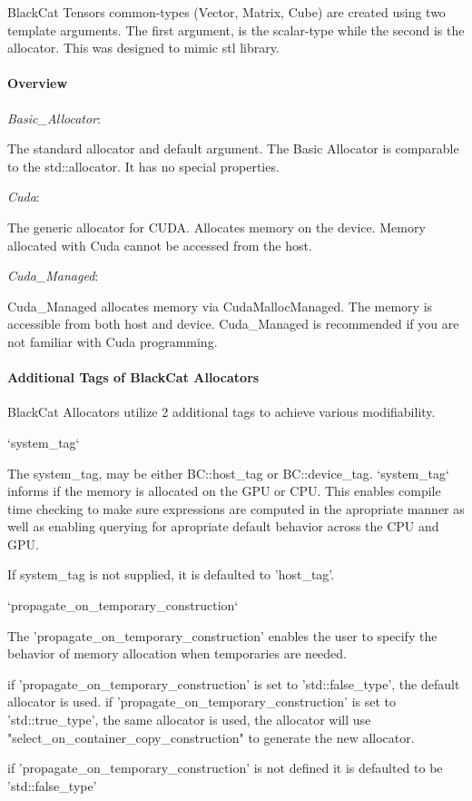 Black\+Cat Tensor\textquotesingle{}s common-\/types (Vector, Matrix, Cube) are created using two template arguments. The first argument, is the scalar-\/type while the second is the allocator. This was designed to mimic {\ttfamily stl} library.

\paragraph*{Overview}

{\itshape Basic\+\_\+\+Allocator}\+: \begin{DoxyVerb}The standard allocator and default argument.
The Basic Allocator is comparable to the std::allocator.
It has no special properties.
\end{DoxyVerb}


{\itshape Cuda}\+: \begin{DoxyVerb}The generic allocator for CUDA. 
Allocates memory on the device. 
Memory allocated with Cuda cannot be accessed from the host.
\end{DoxyVerb}


{\itshape Cuda\+\_\+\+Managed}\+: \begin{DoxyVerb}Cuda_Managed allocates memory via CudaMallocManaged. 
The memory is accessible from both host and device. 
Cuda_Managed is recommended if you are not familiar with Cuda programming.
\end{DoxyVerb}


\paragraph*{Additional Tags of Black\+Cat Allocators}

\begin{DoxyVerb}BlackCat Allocators utilize 2 additional tags to achieve various modifiability. 


`system_tag`

The system_tag, may be either BC::host_tag or BC::device_tag.
`system_tag` informs if the memory is allocated on the GPU or CPU. 
This enables compile time checking to make sure expressions are computed in the apropriate manner as well
as enabling querying for apropriate default behavior across the CPU and GPU. 

If system_tag is not supplied, it is defaulted to 'host_tag'.


`propagate_on_temporary_construction` 

The 'propagate_on_temporary_construction' enables the user to specify the behavior of memory allocation
when temporaries are needed. 

if 'propagate_on_temporary_construction' is set to 'std::false_type', the default allocator is used.
if 'propagate_on_temporary_construction' is set to 'std::true_type', the same allocator is used,
    the allocator will use "select_on_container_copy_construction" to generate the new allocator. 

if 'propagate_on_temporary_construction' is not defined it is defaulted to be 'std::false_type' 
\end{DoxyVerb}


